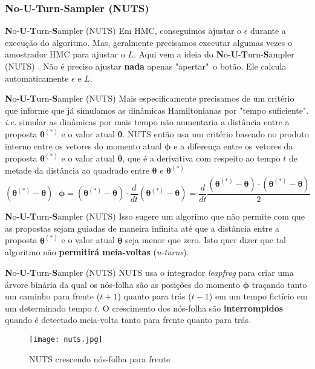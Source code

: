 \subsubsection{No-U-Turn-Sampler (NUTS)}
\begin{frame}{\textbf{N}o-\textbf{U}-\textbf{T}urn-\textbf{S}ampler (NUTS)}
  Em HMC, conseguimos ajustar o $\epsilon$ durante a execução do algoritmo. Mas, geralmente
  precisamos executar algumas vezes o amostrador HMC para ajustar o $L$.
  \vfill
  Aqui vem a ideia do \textbf{N}o-\textbf{U}-\textbf{T}urn-\textbf{S}ampler (NUTS)
  \parencite{hoffman2014no}.
  Não é preciso ajustar \textbf{nada} apenas "apertar"~o botão. Ele calcula automaticamente
  $\epsilon$ e $L$.
\end{frame}

\begin{frame}{\textbf{N}o-\textbf{U}-\textbf{T}urn-\textbf{S}ampler (NUTS)}
  Mais especificamente precisamos de um critério que informe que já simulamos as dinâmicas
  Hamiltonianas por "tempo suficiente". \textit{i.e.} simular as dinâmicas por mais tempo
  não aumentaria a distância entre a proposta $\boldsymbol{\theta}^{(*)}$ e o valor atual
  $\boldsymbol{\theta}$.
  \vfill
  NUTS então usa um critério baseado no produto interno entre os vetores do momento
  atual $\boldsymbol{\phi}$ e a diferença entre os vetores
  da proposta $\boldsymbol{\theta}^{(*)}$ e o valor atual $\boldsymbol{\theta}$,
  que é a derivativa com respeito ao tempo $t$ de metade da distância ao quadrado
  entre $\boldsymbol{\theta}$ e $\boldsymbol{\theta}^{(*)}$
  $$
  (\boldsymbol{\theta}^{(*)} - \boldsymbol{\theta}) \cdot \boldsymbol{\phi}
  = (\boldsymbol{\theta}^{(*)} - \boldsymbol{\theta}) \cdot \frac{d}{dt} (\boldsymbol{\theta}^{(*)} - \boldsymbol{\theta})
  = \frac{d}{dt} \frac{(\boldsymbol{\theta}^{(*)} - \boldsymbol{\theta}) \cdot (\boldsymbol{\theta}^{(*)} - \boldsymbol{\theta})}{2}
  $$
\end{frame}

\begin{frame}{\textbf{N}o-\textbf{U}-\textbf{T}urn-\textbf{S}ampler (NUTS)}
  Isso sugere um algorimo que não permite com que as propostas sejam guiadas de maneira
  infinita até que a distância entre a proposta $\boldsymbol{\theta}^{(*)}$ e o valor atual
  $\boldsymbol{\theta}$ seja menor que zero.
  \vfill
  Isto quer dizer que tal algoritmo não \textbf{permitirá meia-voltas} (\textit{u-turns}).
\end{frame}

\begin{frame}{\textbf{N}o-\textbf{U}-\textbf{T}urn-\textbf{S}ampler (NUTS)}
  NUTS usa o integrador \textit{leapfrog} para criar uma árvore binária da qual os nós-folha
  são as posições do momento $\boldsymbol{\phi}$ traçando tanto um caminho para frente
  ($t+1$) quanto para trás ($t-1$) em um tempo fictício em um determinado tempo $t$.
  O crescimento dos nós-folha são \textbf{interrompidos} quando é detectado meia-volta
  tanto para frente quanto para trás.
  \begin{figure}
    \centering
    \texttt{[image: nuts.jpg]}
    \caption{NUTS crescendo nós-folha para frente}
  \end{figure}
\end{frame}

